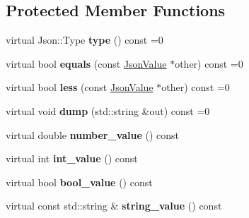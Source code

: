 \subsection*{Protected Member Functions}
\begin{DoxyCompactItemize}
\item 
\mbox{\label{classjson11_1_1_json_value_abad3377adfead681fdf42c5c6aec6b2a}} 
virtual Json\+::\+Type {\bfseries type} () const =0
\item 
\mbox{\label{classjson11_1_1_json_value_a2730125126e440ecb6ef5de9f2ce8ddf}} 
virtual bool {\bfseries equals} (const \mbox{\hyperlink{classjson11_1_1_json_value}{Json\+Value}} $\ast$other) const =0
\item 
\mbox{\label{classjson11_1_1_json_value_a028ef0c49d746853c69c36cd784ce862}} 
virtual bool {\bfseries less} (const \mbox{\hyperlink{classjson11_1_1_json_value}{Json\+Value}} $\ast$other) const =0
\item 
\mbox{\label{classjson11_1_1_json_value_a7b091df08f99eb9e8c01554b2c058c86}} 
virtual void {\bfseries dump} (std\+::string \&out) const =0
\item 
\mbox{\label{classjson11_1_1_json_value_add546ac727d19c92888028745bd71713}} 
virtual double {\bfseries number\+\_\+value} () const
\item 
\mbox{\label{classjson11_1_1_json_value_a35bcf1583c7d9e14ebc0aba745670dbf}} 
virtual int {\bfseries int\+\_\+value} () const
\item 
\mbox{\label{classjson11_1_1_json_value_a0f239dbb429278cc00573e4bcadce866}} 
virtual bool {\bfseries bool\+\_\+value} () const
\item 
\mbox{\label{classjson11_1_1_json_value_a504b77271f3aab4ff4a7e61653b9c264}} 
virtual const std\+::string \& {\bfseries string\+\_\+value} () const
\item 
\mbox{\label{classjson11_1_1_json_value_a66c1fec1624e25ede589dc541f2b5913}} 

\end{DoxyCompactItemize}
